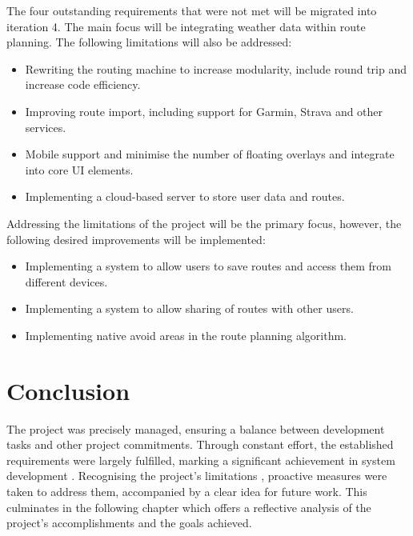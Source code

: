 The four outstanding requirements that were not met will be migrated into iteration 4. The main focus will be integrating weather data within route planning. The following limitations will also be addressed:
\begin{itemize}
    \item Rewriting the routing machine to increase modularity, include round trip and increase code efficiency.
    \item Improving route import, including support for Garmin, Strava and other services.
    \item Mobile support and minimise the number of floating overlays and integrate into core UI elements.
    \item Implementing a cloud-based server to store user data and routes.
\end{itemize}
Addressing the limitations of the project will be the primary focus, however, the following desired improvements will be implemented:
\begin{itemize}
    \item Implementing a system to allow users to save routes and access them from different devices.
    \item Implementing a system to allow sharing of routes with other users.
    \item Implementing native avoid areas in the route planning algorithm.
\end{itemize}

\section{Conclusion}
\label{evaluation:conclusion}

The project was precisely managed, ensuring a balance between development tasks and other project commitments. Through constant effort, the established requirements were largely fulfilled, marking a significant achievement in system development . Recognising the project's limitations , proactive measures were taken to address them, accompanied by a clear idea for future work. This culminates in the following chapter which offers a reflective analysis of the project's accomplishments and the goals achieved.



